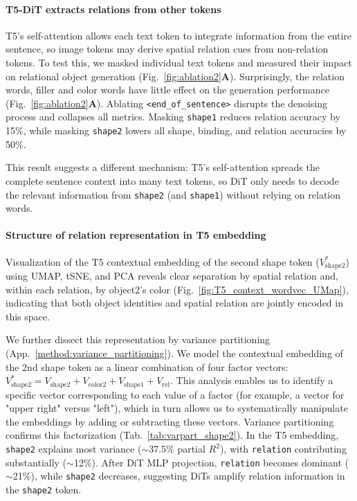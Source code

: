 \documentclass[10pt,twocolumn,letterpaper]{article}
\begin{document}
\paragraph{T5-DiT extracts relations from other tokens}
T5's self-attention allows each text token to integrate information from the entire sentence, so image tokens may derive spatial relation cues from non-relation tokens. To test this, we masked individual text tokens and measured their impact on relational object generation (Fig.~\ref{fig:ablation2}\textbf{A}). 
Surprisingly, the relation words, filler and color words have little effect on the generation performance (Fig.~\ref{fig:ablation2}\textbf{A}). 
Ablating \texttt{<end\_of\_sentence>} disrupts the denoising process and collapses all metrics. Masking \texttt{shape1} reduces relation accuracy by 15\%, while masking \texttt{shape2} lowers all shape, binding, and relation accuracies by 50\%.

This result suggests a different mechanism: T5's self-attention spreads the complete sentence context into many text tokens, so DiT only needs to decode the relevant information from \texttt{shape2} (and \texttt{shape1}) without relying on relation words. %


\paragraph{Structure of relation representation in T5 embedding}
Visualization of the T5 contextual embedding of the second shape token ($V^*_{\text{shape2}}$) using UMAP, tSNE, and PCA reveals clear separation by spatial relation and, within each relation, by object2's color (Fig.~\ref{fig:T5_context_wordvec_UMap}), indicating that both object identities and spatial relation are jointly encoded in this space.

We further dissect this representation by variance partitioning (App.~\ref{method:variance_partitioning}). We model the contextual embedding of the 2nd shape token as a linear combination of four factor vectors:
$V^*_{\text{shape2}}=V_{\text{shape2}}+V_{\text{color2}}+V_{\text{shape1}}+V_{\text{rel}}$.
This analysis enables us to identify a specific vector corresponding to each value of a factor (for example, a vector for "upper right" versus "left"), which in turn allows us to systematically manipulate the embeddings by adding or subtracting these vectors.
Variance partitioning confirms this factorization (Tab.~\ref{tab:varpart_shape2}). 
In the T5 embedding, \texttt{shape2} explains most variance ($\sim$37.5\% partial $R^2$), with \texttt{relation} contributing substantially ($\sim$12\%). After DiT MLP projection, \texttt{relation} becomes dominant ($\sim$21\%), while \texttt{shape2} decreases, suggesting DiTs amplify relation information in the \texttt{shape2} token.
\end{document}
